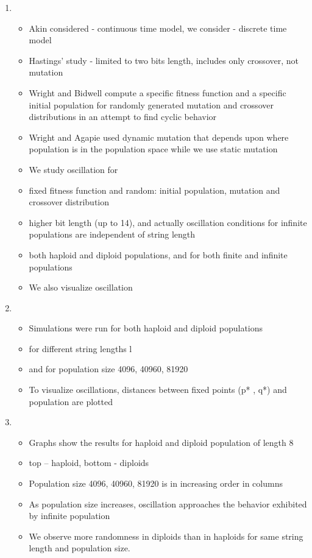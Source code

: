\documentclass{article}
\begin{document}
\begin{enumerate}
    
\item
  \begin{itemize}
  \item Akin considered - continuous time model, we consider -
    discrete time model
   \item Hastings' study - limited to two bits length, includes only
     crossover, not mutation
  \item Wright and Bidwell compute a specific fitness function and a
    specific initial population for randomly generated mutation and
    crossover distributions in an attempt to find cyclic behavior
  \item Wright and Agapie used dynamic mutation that depends upon
    where population is in the population space while we use static
    mutation
  \item We study oscillation for
  \item fixed fitness function and random: initial population,
    mutation and crossover distribution
  \item higher bit length (up to 14), and actually oscillation
    conditions for infinite populations are independent of string
    length
  \item both haploid and diploid populations, and for both finite and
    infinite populations
  \item We also visualize oscillation
  \end{itemize}

\item
  \begin{itemize}
  \item Simulations were run for both haploid and diploid populations
  \item for different string lengths l
  \item and for population size {4096, 40960, 81920}
  \item To visualize oscillations, distances between fixed points (p*
    , q*) and population are plotted
  \end{itemize}
    
\item
  \begin{itemize}
  \item Graphs show the results for haploid and diploid population of
    length 8
   \item top – haploid, bottom - diploids
  \item Population size {4096, 40960, 81920} is in increasing order in columns
  \item As population size increases, oscillation approaches the
    behavior exhibited by infinite population
  \item We observe more randomness in diploids than in haploids for
    same string length and population size.
  \end{itemize}
    

\end{enumerate}
\end{document}
